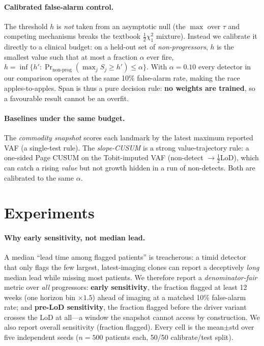 \documentclass[11pt]{article}
\newcommand{\1}{\mathbf{1}}
\begin{document}
\paragraph{Calibrated false-alarm control.}
The threshold $h$ is \emph{not} taken from an asymptotic null (the $\max$ over
$\tau$ and competing mechanisms breaks the textbook $\tfrac12\chi^2_1$ mixture).
Instead we calibrate it directly to a clinical budget: on a held-out set of
\emph{non-progressors}, $h$ is the smallest value such that at most a fraction
$\alpha$ ever fire,
\(
h=\inf\{h':\Pr_{\text{non-prog}}(\max_j S_j\ge h')\le\alpha\}.
\)
With $\alpha=0.10$ every detector in our comparison operates at the same 10\%
false-alarm rate, making the race apples-to-apples. Span is thus a pure
decision rule: \textbf{no weights are trained}, so a favourable result cannot be
an overfit.

\paragraph{Baselines under the same budget.} The \emph{commodity snapshot} scores
each landmark by the latest maximum reported VAF (a single-test rule). The
\emph{slope-CUSUM} is a strong value-trajectory rule: a one-sided Page CUSUM on
the Tobit-imputed VAF (non-detect $\to\tfrac12$LoD), which can catch a rising
\emph{value} but not growth hidden in a run of non-detects. Both are calibrated to
the same $\alpha$.

\section{Experiments}\label{sec:exp}

\paragraph{Why early sensitivity, not median lead.}
A median ``lead time among flagged patients'' is treacherous: a timid detector
that only flags the few largest, latest-imaging clones can report a deceptively
\emph{long} median lead while missing most patients. We therefore report a
\emph{denominator-fair} metric over \emph{all} progressors: \textbf{early
sensitivity}, the fraction flagged at least 12 weeks (one horizon bin $\times 1.5$)
ahead of imaging at a matched 10\% false-alarm rate; and \textbf{pre-LoD
sensitivity}, the fraction flagged before the driver variant crosses the LoD at
all---a window the snapshot cannot access by construction. We also report overall
sensitivity (fraction flagged). Every cell is the mean$\pm$std over five
independent seeds ($n{=}500$ patients each, 50/50 calibrate/test split).
\end{document}
